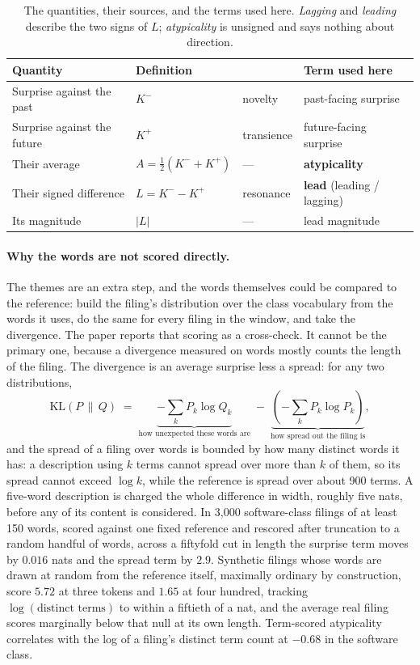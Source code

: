 \begin{table}[h]\centering\small
\caption{The quantities, their sources, and the terms used here. \emph{Lagging}
and \emph{leading} describe the two signs of $L$; \emph{atypicality} is
unsigned and says nothing about direction.}
\label{tab:constructs}
\begin{tabular}{llll}
\toprule
Quantity & Definition & \citeauthor{Murdock2017} & Term used here \\
\midrule
Surprise against the past   & $K^{-}$                        & novelty    & past-facing surprise \\
Surprise against the future & $K^{+}$                        & transience & future-facing surprise \\
Their average               & $A = \tfrac{1}{2}(K^{-}+K^{+})$ & ---        & \textbf{atypicality} \\
Their signed difference     & $L = K^{-}-K^{+}$              & resonance  & \textbf{lead} (leading / lagging) \\
Its magnitude               & $|L|$                          & ---        & lead magnitude \\
\bottomrule
\end{tabular}
\end{table}

\paragraph{Why the words are not scored directly.} The themes are an extra
step, and the words themselves could be compared to the reference: build the
filing's distribution over the class vocabulary from the words it uses, do
the same for every filing in the window, and take the divergence. The paper
reports that scoring as a cross-check. It cannot be the primary one, because
a divergence measured on words mostly counts the length of the filing. The
divergence is an average surprise less a spread: for any two distributions,
\[
  \mathrm{KL}(P \,\|\, Q) \;=\; \underbrace{-\textstyle\sum_k P_k \log Q_k}_{\text{how unexpected these words are}}
  \;-\; \underbrace{\left(-\textstyle\sum_k P_k \log P_k\right)}_{\text{how spread out the filing is}} ,
\]
and the spread of a filing over words is bounded by how many distinct words it
has: a description using $k$ terms cannot spread over more than $k$ of them,
so its spread cannot exceed $\log k$, while the reference is spread over about
900 terms. A five-word description is charged the whole difference in width,
roughly five nats, before any of its content is considered. In 3{,}000
software-class filings of at least 150 words, scored against one fixed
reference and rescored after truncation to a random handful of words,
across a fiftyfold cut in length
the surprise term moves by $0.016$ nats and the spread term by $2.9$. Synthetic
filings whose words are drawn at random from the reference itself, maximally
ordinary by construction, score $5.72$ at three tokens and $1.65$ at four
hundred, tracking $\log(\text{distinct terms})$ to within a fiftieth of a
nat, and the average real filing scores marginally below that null at its
own length. Term-scored atypicality correlates with the log of a filing's
distinct term count at $-0.68$ in the software class.

